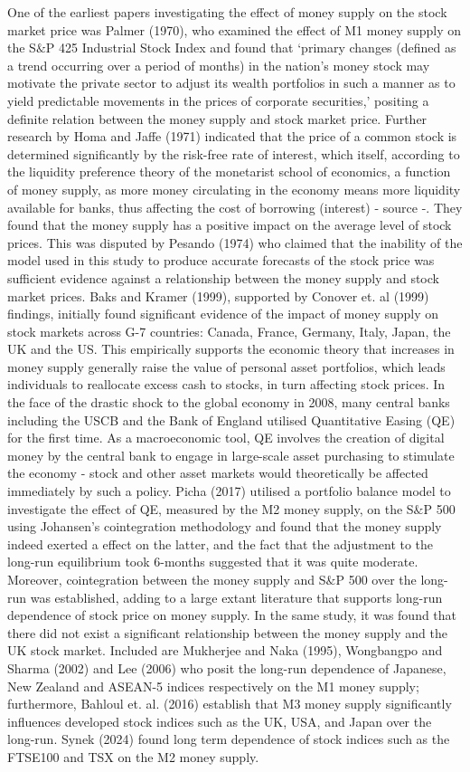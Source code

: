 \documentclass[12pt,a4paper]{article}
\begin{document}
One of the earliest papers investigating the effect of money supply on the stock market price was Palmer (1970), who examined the effect of M1 money supply on the S$\&$P 425 Industrial Stock Index and found that ‘primary changes (defined as a trend occurring over a period of
months) in the nation's money stock may motivate the private sector to adjust its wealth portfolios in such a manner as to yield predictable movements in the prices of corporate securities,’ positing a definite relation between the money supply and stock market price. Further research by Homa and Jaffe (1971) indicated that the price of a common stock is determined significantly by the risk-free rate of interest, which itself, according to the liquidity preference theory of the monetarist school of economics, a function of money supply, as more money circulating in the economy means more liquidity available for banks, thus affecting the cost of borrowing (interest) - source -. They found that the money supply has a positive impact on the average level of stock prices. This was disputed by Pesando (1974) who claimed that the inability of the model used in this study to produce accurate forecasts of the stock price was sufficient evidence against a relationship between the money supply and stock market prices. Baks and Kramer (1999), supported by Conover et. al (1999) findings, initially found significant evidence of the impact of money supply on stock markets across G-7 countries:  Canada, France, Germany, Italy, Japan, the UK and the US. This empirically supports the economic theory that increases in money supply generally raise the value of personal asset portfolios, which leads individuals to reallocate excess cash to stocks, in turn affecting stock prices. In the face of the drastic shock to the global economy in 2008, many central banks including the USCB and the Bank of England utilised Quantitative Easing (QE) for the first time. As a macroeconomic tool, QE involves the creation of digital money by the central bank to engage in large-scale asset purchasing to stimulate the economy - stock and other asset markets would theoretically be affected immediately by such a policy. Picha (2017) utilised a portfolio balance model to investigate the effect of QE, measured by the M2 money supply, on the S$\&$P 500 using Johansen’s cointegration methodology and found that the money supply indeed exerted a effect on the latter, and the fact that the adjustment to the long-run equilibrium took 6-months suggested that it was quite moderate. Moreover, cointegration between the money supply and S$\&$P 500 over the long-run was established, adding to a large extant literature that supports long-run dependence of stock price on money supply. In the same study, it was found that there did not exist a significant relationship between the money supply and the UK stock market. Included are Mukherjee and Naka (1995), Wongbangpo and Sharma (2002) and Lee (2006) who posit the long-run dependence of Japanese, New Zealand and ASEAN-5 indices respectively on the M1 money supply; furthermore, Bahloul et. al. (2016) establish that M3 money supply significantly influences developed stock indices such as the UK, USA, and Japan over the long-run. Synek (2024) found long term dependence of stock indices such as the FTSE100 and TSX on the M2 money supply.
\end{document}
